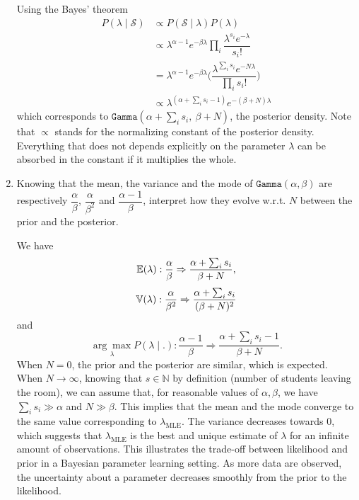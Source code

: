 \documentclass[11pt, a4paper]{article}
\begin{document}
\begin{enumerate}
    \begin{solution}
        Using the Bayes' theorem
        \begin{align*}
            P(\lambda \mid \mathcal{S}) &\propto P(\mathcal{S} \mid \lambda) P(\lambda)\\
            &\propto \lambda^{\alpha - 1} e^{-\beta \lambda} \prod_i \dfrac{\lambda ^{s_i} e^{-\lambda}}{s_i!}\\
            &= \lambda^{\alpha - 1} e^{-\beta \lambda} \bigg(\dfrac{\lambda ^{\sum_i s_i} e^{-N\lambda}}{\prod_is_i!}\bigg)\\
            &\propto \lambda^{(\alpha + \sum_i s_i - 1)} e^{-(\beta + N) \lambda}
        \end{align*}
        which corresponds to $\texttt{Gamma}(\alpha + \sum_i s_i,\  \beta + N)$, the posterior density. Note that $\propto$ stands for the normalizing constant of the posterior density. Everything that does not depends explicitly on the parameter $\lambda$ can be absorbed in the constant if it multiplies the whole.
    \end{solution}
    \item Knowing that the mean, the variance and the mode of $\texttt{Gamma}(\alpha, \beta)$ are respectively $\dfrac{\alpha}{\beta}$, $\dfrac{\alpha}{\beta^2}$ and $\dfrac{\alpha-1}{\beta}$, interpret how they evolve w.r.t. $N$ between the prior and the posterior.

    \begin{solution}
        We have 
        $$\mathbb{E}(\lambda): \dfrac{\alpha}{\beta} \Rightarrow \dfrac{\alpha + \sum_i s_i}{\beta + N},$$
        $$\mathbb{V}(\lambda): \dfrac{\alpha}{\beta^2} \Rightarrow \dfrac{\alpha + \sum_i s_i}{(\beta + N)^2}$$
        and
        $$\underset{\lambda}{\arg \max}P(\lambda\mid .): \dfrac{\alpha -1}{\beta} \Rightarrow \dfrac{\alpha + \sum_i s_i - 1}{\beta + N}.$$
        When $N = 0$, the prior and the posterior are similar, which is expected. When $N \rightarrow \infty$, knowing that $s\in \mathbb{N}$ by definition (number of students leaving the room), we can assume that, for reasonable values of $\alpha, \beta$, we have $\sum_i s_i \gg \alpha$ and $N \gg \beta$. This implies that the mean and the mode converge to the same value corresponding to $\lambda_{\text{MLE}}$. The variance decreases towards 0, which suggests that $\lambda_{\text{MLE}}$ is the best and unique estimate of $\lambda$ for an infinite amount of observations. This illustrates the trade-off between likelihood and prior in a Bayesian parameter learning setting. As more data are observed, the uncertainty about a parameter decreases smoothly from the prior to the likelihood.
    \end{solution}
\end{enumerate}
\end{document}
